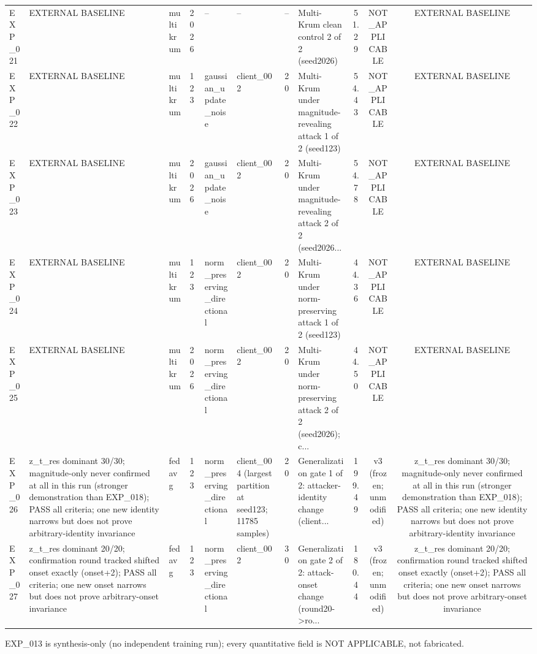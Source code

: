 \begin{table}[t]
\begin{tabular}{llllllllccc}
EXP\_021 & EXTERNAL BASELINE & multikrum & 2026 & -- & -- & -- & Multi-Krum clean control 2 of 2 (seed2026) & 51.29 & NOT\_APPLICABLE & EXTERNAL BASELINE \\
EXP\_022 & EXTERNAL BASELINE & multikrum & 123 & gaussian\_update\_noise & client\_002 & 20 & Multi-Krum under magnitude-revealing attack 1 of 2 (seed123) & 54.43 & NOT\_APPLICABLE & EXTERNAL BASELINE \\
EXP\_023 & EXTERNAL BASELINE & multikrum & 2026 & gaussian\_update\_noise & client\_002 & 20 & Multi-Krum under magnitude-revealing attack 2 of 2 (seed2026... & 54.78 & NOT\_APPLICABLE & EXTERNAL BASELINE \\
EXP\_024 & EXTERNAL BASELINE & multikrum & 123 & norm\_preserving\_directional & client\_002 & 20 & Multi-Krum under norm-preserving attack 1 of 2 (seed123) & 44.36 & NOT\_APPLICABLE & EXTERNAL BASELINE \\
EXP\_025 & EXTERNAL BASELINE & multikrum & 2026 & norm\_preserving\_directional & client\_002 & 20 & Multi-Krum under norm-preserving attack 2 of 2 (seed2026); c... & 44.50 & NOT\_APPLICABLE & EXTERNAL BASELINE \\
EXP\_026 & z\_t\_res dominant 30/30; magnitude-only never confirmed at all in this run (stronger demonstration than EXP\_018); PASS all criteria; one new identity narrows but does not prove arbitrary-identity invariance & fedavg & 123 & norm\_preserving\_directional & client\_004 (largest partition at seed123; 11785 samples) & 20 & Generalization gate 1 of 2: attacker-identity change (client... & 199.49 & v3 (frozen; unmodified) & z\_t\_res dominant 30/30; magnitude-only never confirmed at all in this run (stronger demonstration than EXP\_018); PASS all criteria; one new identity narrows but does not prove arbitrary-identity invariance \\
EXP\_027 & z\_t\_res dominant 20/20; confirmation round tracked shifted onset exactly (onset+2); PASS all criteria; one new onset narrows but does not prove arbitrary-onset invariance & fedavg & 123 & norm\_preserving\_directional & client\_002 & 30 & Generalization gate 2 of 2: attack-onset change (round20->ro... & 180.44 & v3 (frozen; unmodified) & z\_t\_res dominant 20/20; confirmation round tracked shifted onset exactly (onset+2); PASS all criteria; one new onset narrows but does not prove arbitrary-onset invariance \\
\bottomrule
\end{tabular}
\vspace{2pt}\par\raggedright\footnotesize EXP\_013 is synthesis-only (no independent training run); every quantitative field is NOT APPLICABLE, not fabricated.
\end{table}

